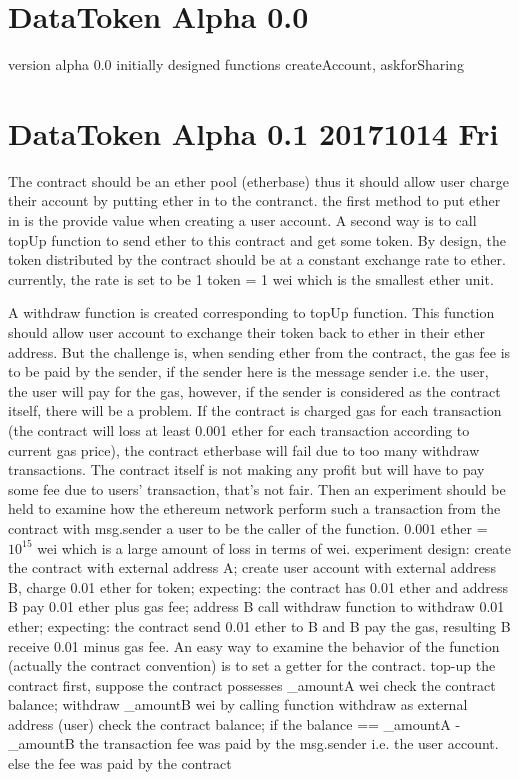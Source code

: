 \section{DataToken Alpha 0.0}
version alpha 0.0 
initially designed functions
createAccount, askforSharing

\section{DataToken Alpha 0.1 20171014 Fri}
The contract should be an ether pool (etherbase)
thus it should allow user charge their account by putting ether in to the contranct.
the first method to put ether in is the provide value when creating a user account.
A second way is to call topUp function to send ether to this contract and get some token.
By design, the token distributed by the contract should be at a constant exchange rate to ether.
currently, the rate is set to be 1 token = 1 wei which is the smallest ether unit.

A withdraw function is created corresponding to topUp function.
This function should allow user account to exchange their token back to ether in their ether address.
But the challenge is, when sending ether from the contract, the gas fee is to be paid by the sender, if the sender here is the message sender i.e. the user,
the user will pay for the gas, however, if the sender is considered as the contract itself, there will be a problem.
If the contract is charged gas for each transaction (the contract will loss at least 0.001 ether for each transaction according to current gas price),
the contract etherbase will fail due to too many withdraw transactions. The contract itself is not making any profit but will have to pay some fee due to users' transaction,
that's not fair.
Then an experiment should be held to examine how the ethereum network perform such a transaction from the contract with msg.sender a user to be the caller of the function.
$0.001$ ether = $10^15$  wei which is a large amount of loss in terms of wei.
    experiment design:
    create the contract with external address A;
    create user account with external address B, charge 0.01 ether for token;
        expecting: the contract has 0.01 ether and address B pay 0.01 ether plus gas fee;
    address B call withdraw function to withdraw 0.01 ether;
        expecting: the contract send 0.01 ether to B and B pay the gas, resulting B receive 0.01 minus gas fee.
    An easy way to examine the behavior of the function (actually the contract convention) is to set a getter for the contract.
    top-up the contract first, suppose the contract possesses \_amountA wei
        check the contract balance;
    withdraw \_amountB wei by calling function withdraw as external address (user)
        check the contract balance;
        if the balance == \_amountA - \_amountB
            the transaction fee was paid by the msg.sender i.e. the user account.
        else
            the fee was paid by the contract

